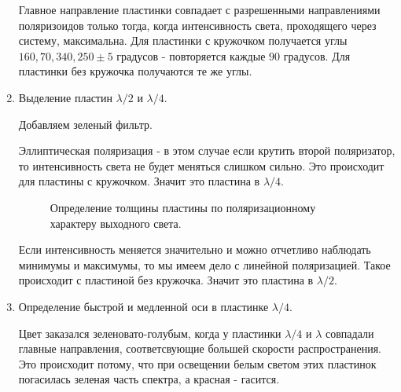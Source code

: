 \documentclass[a4paper,12pt]{article}
\theoremstyle{plain} %
\theoremstyle{definition} %
\theoremstyle{remark} %
\begin{document}
\begin{enumerate}
	Главное направление пластинки совпадает с разрешенными направлениями поляризоидов только тогда, когда интенсивность света, проходящего через систему, максимальна. 
	Для пластинки с кружочком получается углы $160, 70, 340, 250 \pm 5$ градусов - повторяется каждые $90$ градусов. Для пластинки без кружочка получаются те же углы.
	
	\item Выделение пластин $\lambda/2$ и $\lambda/4$.

	Добавляем зеленый фильтр.
	
	Эллиптическая поляризация - в этом случае если крутить второй поляризатор, то интенсивность света не будет меняться слишком сильно. Это происходит для пластины с кружочком. Значит это пластина в $\lambda/4$.
	
	\begin{figure}[h!]
		\caption{Определение толщины пластины по поляризационному характеру выходного света.}
	\end{figure}
	
	Если интенсивность меняется значительно и можно отчетливо наблюдать минимумы и максимумы, то мы имеем дело с линейной поляризацией. Такое происходит с пластиной без кружочка. Значит это пластина в $\lambda/2$.

	\item Определение быстрой и медленной оси в пластинке $\lambda/4$.
	
	Цвет заказался зеленовато-голубым, когда у пластинки $\lambda/4$ и $\lambda$ совпадали главные направления, соответсвующие большей скорости распространения. Это происходит потому, что при освещении белым светом этих пластинок погасилась зеленая часть спектра, а красная - гасится.
	

\end{enumerate}
\end{document}
